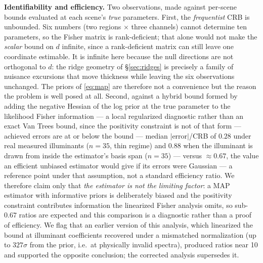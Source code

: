 \documentclass[10pt]{article}
\begin{document}
\textbf{Identifiability and efficiency.} Two observations, made against per-scene bounds evaluated at each scene's \emph{true} parameters. First, the \emph{frequentist} CRB is unbounded. Six numbers (two regions $\times$ three channels) cannot determine ten parameters, so the Fisher matrix is rank-deficient; that alone would not make the \emph{scalar} bound on $d$ infinite, since a rank-deficient matrix can still leave one coordinate estimable. It is infinite here because the null directions are not orthogonal to $d$: the ridge geometry of \S\ref{sec:ridges} is precisely a family of nuisance excursions that move thickness while leaving the six observations unchanged. The priors of \eqref{eq:map} are therefore not a convenience but the reason the problem is well posed at all. Second, against a hybrid bound formed by adding the negative Hessian of the log prior at the true parameter to the likelihood Fisher information --- a local regularized diagnostic rather than an exact Van Trees bound, since the positivity constraint is not of that form --- achieved errors are at or below the bound --- median $|$error$|$/CRB of $0.28$ under real measured illuminants ($n{=}35$, thin regime) and $0.88$ when the illuminant is drawn from inside the estimator's basis span ($n{=}35$) --- versus $\approx\!0.67$, the value an efficient unbiased estimator would give if its errors were Gaussian --- a reference point under that assumption, not a standard efficiency ratio. We therefore claim only that \emph{the estimator is not the limiting factor}: a MAP estimator with informative priors is deliberately biased and the positivity constraint contributes information the linearized Fisher analysis omits, so sub-$0.67$ ratios are expected and this comparison is a diagnostic rather than a proof of efficiency. We flag that an earlier version of this analysis, which linearized the bound at illuminant coefficients recovered under a mismatched normalization (up to $327\sigma$ from the prior, i.e.\ at physically invalid spectra), produced ratios near 10 and supported the opposite conclusion; the corrected analysis supersedes it.
\end{document}
